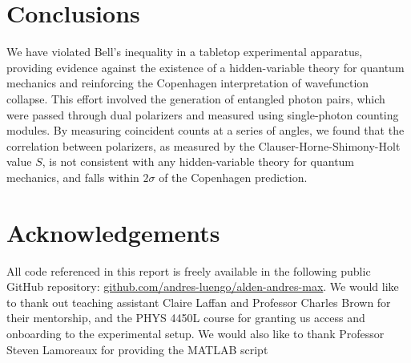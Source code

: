 \documentclass[letter,scriptaddress,twocolumn, prl, nofootinbib]{revtex4}
\begin{document}
{\section{Conclusions}\label{sec:conclusions}
We have violated Bell's inequality in a tabletop experimental apparatus, providing evidence against the existence of a hidden-variable theory for quantum mechanics and reinforcing the Copenhagen interpretation of wavefunction collapse. This effort involved the generation of entangled photon pairs, which were passed through dual polarizers and measured using single-photon counting modules. By measuring coincident counts at a series of angles, we found that the correlation between polarizers, as measured by the Clauser-Horne-Shimony-Holt value $S$, is not consistent with any hidden-variable theory for quantum mechanics, and falls within $2\sigma$ of the Copenhagen prediction. 


\section{Acknowledgements}
All code referenced in this report is freely available in the following public GitHub repository: \href{https://github.com/andres-luengo/alden-andres-max-most-dangerous-4450-trio}{github.com/andres-luengo/alden-andres-max}.
We would like to thank out teaching assistant Claire Laffan and Professor Charles Brown for their mentorship, and the PHYS 4450L course for granting us access and onboarding to the experimental setup. We would also like to thank Professor Steven Lamoreaux for providing the MATLAB script 










}
\end{document}

